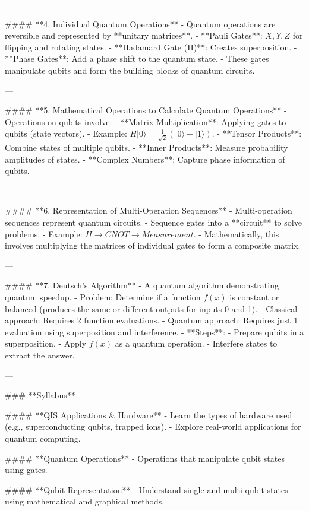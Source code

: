 ---

#### **4. Individual Quantum Operations**
- Quantum operations are reversible and represented by **unitary matrices**.
  - **Pauli Gates**: \(X, Y, Z\) for flipping and rotating states.
  - **Hadamard Gate (H)**: Creates superposition.
  - **Phase Gates**: Add a phase shift to the quantum state.
- These gates manipulate qubits and form the building blocks of quantum circuits.

---

#### **5. Mathematical Operations to Calculate Quantum Operations**
- Operations on qubits involve:
  - **Matrix Multiplication**: Applying gates to qubits (state vectors).
    - Example: \(H|0\rangle = \frac{1}{\sqrt{2}}(|0\rangle + |1\rangle)\).
  - **Tensor Products**: Combine states of multiple qubits.
  - **Inner Products**: Measure probability amplitudes of states.
  - **Complex Numbers**: Capture phase information of qubits.

---

#### **6. Representation of Multi-Operation Sequences**
- Multi-operation sequences represent quantum circuits.
  - Sequence gates into a **circuit** to solve problems.
  - Example: \(H \rightarrow CNOT \rightarrow Measurement\).
  - Mathematically, this involves multiplying the matrices of individual gates to form a composite matrix.

---

#### **7. Deutsch’s Algorithm**
- A quantum algorithm demonstrating quantum speedup.
  - Problem: Determine if a function \(f(x)\) is constant or balanced (produces the same or different outputs for inputs 0 and 1).
  - Classical approach: Requires 2 function evaluations.
  - Quantum approach: Requires just 1 evaluation using superposition and interference.
  - **Steps**:
    - Prepare qubits in a superposition.
    - Apply \(f(x)\) as a quantum operation.
    - Interfere states to extract the answer.

---

### **Syllabus**

#### **QIS Applications & Hardware**
- Learn the types of hardware used (e.g., superconducting qubits, trapped ions).
- Explore real-world applications for quantum computing.

#### **Quantum Operations**
- Operations that manipulate qubit states using gates.

#### **Qubit Representation**
- Understand single and multi-qubit states using mathematical and graphical methods.

